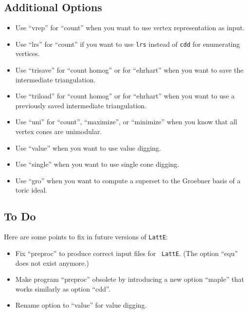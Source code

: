 \subsection{Additional Options}
\begin{itemize}
\item Use ``vrep'' for ``count'' when you want to use vertex
  representation as input. 
\item Use ``lrs'' for ``count'' if you want to use {\tt lrs} instead
  of {\tt cdd} for enumerating vertices.
\item Use ``trisave'' for ``count homog'' or for ``ehrhart'' when you want
  to save the intermediate triangulation.
\item Use ``triload'' for ``count homog'' or for ``ehrhart'' when you want
  to use a previously saved intermediate triangulation.
\item Use ``uni'' for ``count'', ``maximize'', or ``minimize''
when you know that all vertex cones are unimodular.
\item Use ``value'' when you want to use value digging.
\item Use ``single'' when you want to use single cone digging.
\item Use ``gro'' when you want to compute a superset to the Groebner
basis of a toric ideal.
\end{itemize}

\subsection{To Do}
Here are some points to fix in future versions of {\tt LattE}:
\begin{itemize}
\item Fix ``preproc'' to produce correct input files for {\tt
LattE}. (The option ``equ'' does not exist anymore.)
\item Make program ``preproc'' obsolete by introducing a new option
``maple'' that works similarly as option ``cdd''.
\item Rename option to ``value'' for value digging.
\end{itemize}
